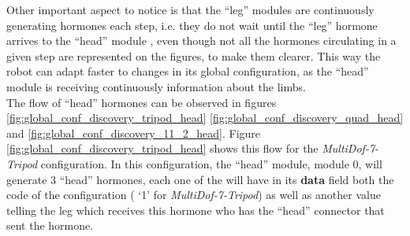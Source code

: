 Other important aspect to notice is that the ``leg'' modules are continuously generating hormones each step, i.e. they do not wait until the ``leg'' hormone arrives to the ``head'' module , even though not all the hormones circulating in a given step are represented on the figures, to make them clearer. This way the robot can adapt faster to changes in its global configuration, as the ``head'' module is receiving continuously information about the limbs.\\

The flow of ``head'' hormones can be observed in figures \ref{fig:global_conf_discovery_tripod_head} \ref{fig:global_conf_discovery_quad_head} and \ref{fig:global_conf_discovery_11_2_head}. Figure \ref{fig:global_conf_discovery_tripod_head} shows this flow for the \emph{MultiDof-7-Tripod} configuration. In this configuration, the ``head'' module, module 0, will generate 3 ``head'' hormones, each one of the will have in its \textbf{data} field both the code of the configuration ( `1' for \emph{MultiDof-7-Tripod}) as well as another value telling the leg which receives this hormone who has the ``head'' connector that sent the hormone.\\
